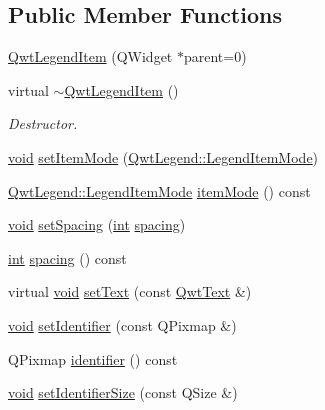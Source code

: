 \subsection*{Public Member Functions}
\begin{DoxyCompactItemize}
\item 
\hyperlink{class_qwt_legend_item_a46f61a0eaaf24a3a78d498db3fc8c457}{Qwt\-Legend\-Item} (Q\-Widget $\ast$parent=0)
\item 
virtual \hyperlink{class_qwt_legend_item_a8c98d47b26d4ad3af98bffc7107f6fc9}{$\sim$\-Qwt\-Legend\-Item} ()
\begin{DoxyCompactList}\small\item\em Destructor. \end{DoxyCompactList}\item 
\hyperlink{group___u_a_v_objects_plugin_ga444cf2ff3f0ecbe028adce838d373f5c}{void} \hyperlink{class_qwt_legend_item_ae6487dbe8f2c72512887df8bcb648d53}{set\-Item\-Mode} (\hyperlink{class_qwt_legend_ab216dd2dba9ebf6cb0ed2dd621a652e0}{Qwt\-Legend\-::\-Legend\-Item\-Mode})
\item 
\hyperlink{class_qwt_legend_ab216dd2dba9ebf6cb0ed2dd621a652e0}{Qwt\-Legend\-::\-Legend\-Item\-Mode} \hyperlink{class_qwt_legend_item_a2574e634e54eb7afff34ca24752c3f9b}{item\-Mode} () const 
\item 
\hyperlink{group___u_a_v_objects_plugin_ga444cf2ff3f0ecbe028adce838d373f5c}{void} \hyperlink{class_qwt_legend_item_a4ff8a83f130d56bf5932c6a35384d85f}{set\-Spacing} (\hyperlink{ioapi_8h_a787fa3cf048117ba7123753c1e74fcd6}{int} \hyperlink{class_qwt_legend_item_adc59d1683f3bb11a795098776e76c0bc}{spacing})
\item 
\hyperlink{ioapi_8h_a787fa3cf048117ba7123753c1e74fcd6}{int} \hyperlink{class_qwt_legend_item_adc59d1683f3bb11a795098776e76c0bc}{spacing} () const 
\item 
virtual \hyperlink{group___u_a_v_objects_plugin_ga444cf2ff3f0ecbe028adce838d373f5c}{void} \hyperlink{class_qwt_legend_item_a8420c4d8cd73945a25697109df5c2f0e}{set\-Text} (const \hyperlink{class_qwt_text}{Qwt\-Text} \&)
\item 
\hyperlink{group___u_a_v_objects_plugin_ga444cf2ff3f0ecbe028adce838d373f5c}{void} \hyperlink{class_qwt_legend_item_a24495f46aa413af62f1228b4cc13f237}{set\-Identifier} (const Q\-Pixmap \&)
\item 
Q\-Pixmap \hyperlink{class_qwt_legend_item_ab9dc7521b29d0e7b5cdd021db2dd7e4a}{identifier} () const 
\item 
\hyperlink{group___u_a_v_objects_plugin_ga444cf2ff3f0ecbe028adce838d373f5c}{void} \hyperlink{class_qwt_legend_item_aecd9706e156b236b64a2eb5115c7a9ae}{set\-Identifier\-Size} (const Q\-Size \&)

\end{DoxyCompactItemize}
